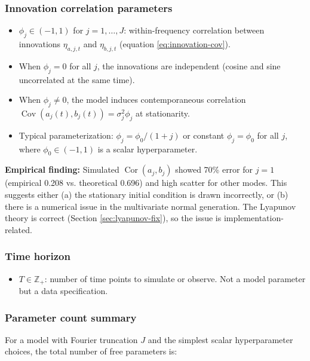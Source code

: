 \documentclass[answers,12pt,addpoints]{exam}
\begin{document}
\subsubsection*{Innovation correlation parameters}

\begin{itemize}
  \item $\phi_j \in (-1,1)$ for $j=1,\dots,J$: within-frequency correlation between innovations $\eta_{a,j,t}$ and $\eta_{b,j,t}$ (equation \eqref{eq:innovation-cov}).
  \item When $\phi_j = 0$ for all $j$, the innovations are independent (cosine and sine uncorrelated at the same time).
  \item When $\phi_j \neq 0$, the model induces contemporaneous correlation $\operatorname{Cov}(a_j(t), b_j(t)) = \sigma_j^2 \phi_j$ at stationarity.
  \item Typical parameterization: $\phi_j = \phi_0 / (1 + j)$ or constant $\phi_j = \phi_0$ for all $j$, where $\phi_0 \in (-1,1)$ is a scalar hyperparameter.
\end{itemize}

{\color{blue}
\textbf{Empirical finding:} Simulated $\operatorname{Cor}(a_j, b_j)$ showed 70\% error for $j=1$ (empirical 0.208 vs. theoretical 0.696) and high scatter for other modes. This suggests either (a) the stationary initial condition is drawn incorrectly, or (b) there is a numerical issue in the multivariate normal generation. The Lyapunov theory is correct (Section \ref{sec:lyapunov-fix}), so the issue is implementation-related.
}

\subsubsection*{Time horizon}

\begin{itemize}
  \item $T \in \mathbb{Z}_+$: number of time points to simulate or observe. Not a model parameter but a data specification.
\end{itemize}

\subsubsection*{Parameter count summary}

For a model with Fourier truncation $J$ and the simplest scalar hyperparameter choices, the total number of free parameters is:
\end{document}
